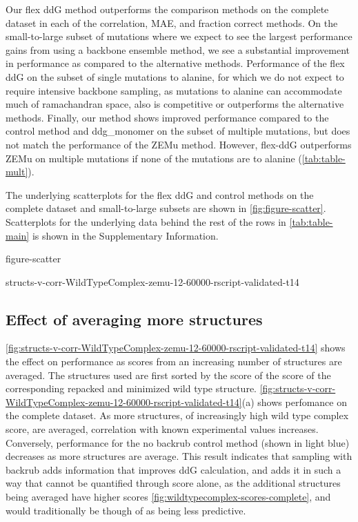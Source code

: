 Our flex ddG method outperforms the comparison methods on the complete dataset in each of the correlation, MAE, and fraction correct methods. On the small-to-large subset of mutations where we expect to see the largest performance gains from using a backbone ensemble method, we see a substantial improvement in performance as compared to the alternative methods. Performance of the flex ddG on the subset of single mutations to alanine, for which we do not expect to require intensive backbone sampling, as mutations to alanine can accommodate much of ramachandran space\cite{cunningham_high-resolution_1989}, also is competitive or outperforms the alternative methods. Finally, our method shows improved performance compared to the control method and ddg\_monomer on the subset of multiple mutations, but does not match the performance of the ZEMu method.
However, flex-ddG outperforms ZEMu on multiple mutations if none of the mutations are to alanine (\cref{tab:table-mult}).

The underlying scatterplots for the flex ddG and control methods on the complete dataset and small-to-large subsets are shown in \cref{fig:figure-scatter}. Scatterplots for the underlying data behind the rest of the rows in \cref{tab:table-main} is shown in the Supplementary Information.

{figure-scatter}

{structs-v-corr-WildTypeComplex-zemu-12-60000-rscript-validated-t14}

\subsection{Effect of averaging more structures}

\cref{fig:structs-v-corr-WildTypeComplex-zemu-12-60000-rscript-validated-t14} shows the effect on performance as scores from an increasing number of structures are averaged.
The structures used are first sorted by the score of the score of the corresponding repacked and minimized wild type structure.
\cref{fig:structs-v-corr-WildTypeComplex-zemu-12-60000-rscript-validated-t14}(a) shows perfomance on the complete dataset.
As more structures, of increasingly high wild type complex score, are averaged, correlation with known experimental values increases.
Conversely, performance for the no backrub control method (shown in light blue) decreases as more structures are average.
This result indicates that sampling with backrub adds information that improves ddG calculation, and adds it in such a way that cannot be quantified through score alone, as the additional structures being averaged have higher scores \cref{fig:wildtypecomplex-scores-complete}, and would traditionally be though of as being less predictive.

